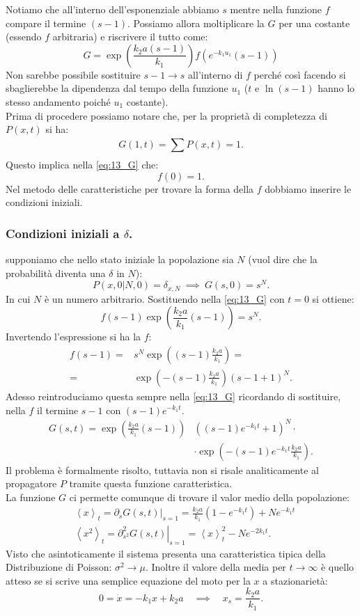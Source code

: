 Notiamo che all'interno dell'esponenziale abbiamo $s$ mentre nella funzione $f$ compare il termine $(s-1)$. Possiamo allora moltiplicare la $G$ per una costante (essendo $f$ arbitraria) e riscrivere il tutto come:
\begin{equation}
    G = \exp\left(\frac{k_2a(s-1) }{k_1}\right)f(e^{-k_1u_1}(s-1) ) \label{eq:13_G}
\end{equation}
Non sarebbe possibile sostituire $s-1 \to s$ all'interno di $f$ perché così facendo si sbaglierebbe la dipendenza dal tempo della funzione $u_1$ ($t$ e $\ln (s-1)$ hanno lo stesso andamento poiché $u_1$ costante).\\
Prima di procedere possiamo notare che, per la proprietà di completezza di $P(x,t)$ si ha:
\[
    G(1,t) = \sum_{}^{} P(x,t) = 1
.\] 
Questo implica nella \ref{eq:13_G} che:
\[
    f(0) = 1
.\] 
Nel metodo delle caratteristiche per trovare la forma della $f$ dobbiamo inserire le condizioni iniziali. 
\subsubsection{Condizioni iniziali a $\delta$.}%
\label{subsub:Condizioni iniziali delta}
supponiamo che nello stato iniziale la popolazione sia $N$ (vuol dire che la probabilità diventa una $\delta$ in $N$):
\[
    P(x,0|N,0) = \delta_{x,N}  \ \implies  \  G(s,0) = s^N
.\] 
In cui $N$ è un numero arbitrario. Sostituendo nella \ref{eq:13_G} con $t=0$ si ottiene:
\[
    f(s-1) \exp\left(\frac{k_2a}{k_1}(s-1)\right) = s^N
.\] 
Invertendo l'espressione si ha la $f$:
\[\begin{aligned}
    f(s-1) =& s^N\exp\left((s-1) \frac{k_2a}{k_1}\right) =\\
    =& \exp\left(-(s-1) \frac{k_2a}{k_1}\right)(s-1 + 1) ^N
.\end{aligned}\]
Adesso reintroduciamo questa sempre nella \ref{eq:13_G} ricordando di sostituire, nella $f$ il termine $s-1$ con $(s-1) e^{-k_1t}$.
\[\begin{aligned}
    G(s,t) = \exp\left(\frac{k_2a}{k_1}(s-1)\right)& ((s-1) e^{-k_1t} + 1)^N \cdot  \\ 
	    &\cdot \exp\left(-(s-1)e^{-k_1t} \frac{k_2a}{k_1}\right)
.\end{aligned}\]
Il problema è formalmente risolto, tuttavia non si risale analiticamente al propagatore $P$ tramite questa funzione caratteristica. \\
La funzione $G$  ci permette comunque di trovare il valor medio della popolazione:
\[\begin{aligned}
    &\left<x\right>_t = \left.\partial_{s}G(s,t)\right|_{s=1} =\frac{k_2a}{k_1}(1-e^{-k_1t}) + Ne^{-k_1t}\\
    &\left<x^2\right>_t = \left.\partial^2_{s^2}G(s,t)\right|_{s=1} = \left<x\right>_t^2 - Ne^{-2k_1t}
.\end{aligned}\]
Visto che asintoticamente il sistema presenta una caratteristica tipica della Distribuzione di Poisson: $\sigma^2\to \mu$. Inoltre il valore della media per $t\to \infty$ è quello atteso se si scrive una semplice equazione del moto per la $x$ a stazionarietà:
\[
0 = \dot{x} = -k_1x + k_2a \quad \implies  \quad x_s = \frac{k_2a}{k_1}
.\] 

